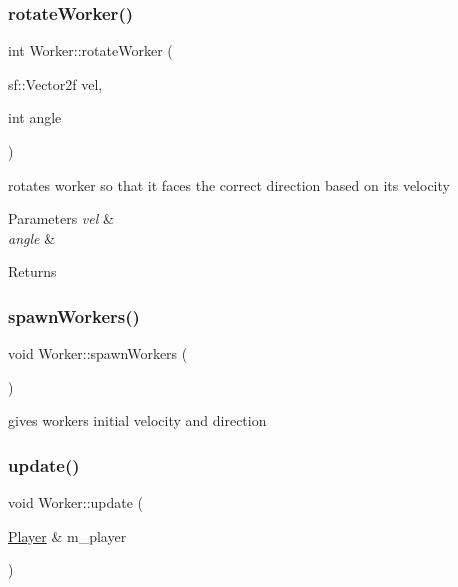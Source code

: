 \subsubsection{\texorpdfstring{rotateWorker()}{rotateWorker()}}
{\footnotesize\ttfamily int Worker\+::rotate\+Worker (\begin{DoxyParamCaption}\item[{sf\+::\+Vector2f}]{vel,  }\item[{int}]{angle }\end{DoxyParamCaption})\hspace{0.3cm}{\ttfamily [private]}}



rotates worker so that it faces the correct direction based on its velocity 


\begin{DoxyParams}{Parameters}
{\em vel} & \\
\hline
{\em angle} & \\
\hline
\end{DoxyParams}
\begin{DoxyReturn}{Returns}

\end{DoxyReturn}
\mbox{\label{class_worker_adc379fc84951cfc33613dcfcae06bc98}} 
\subsubsection{\texorpdfstring{spawnWorkers()}{spawnWorkers()}}
{\footnotesize\ttfamily void Worker\+::spawn\+Workers (\begin{DoxyParamCaption}{ }\end{DoxyParamCaption})\hspace{0.3cm}{\ttfamily [private]}}



gives workers initial velocity and direction 

\mbox{\label{class_worker_a876d7118b9196abe5d3299a941ee5643}} 
\subsubsection{\texorpdfstring{update()}{update()}}
{\footnotesize\ttfamily void Worker\+::update (\begin{DoxyParamCaption}\item[{\mbox{\hyperlink{class_player}{Player}} \&}]{m\+\_\+player }\end{DoxyParamCaption})}




